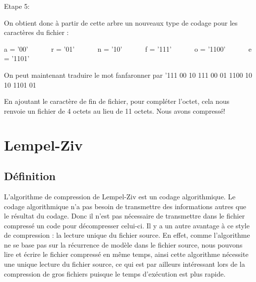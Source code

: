 \documentclass{report}
\begin{document}
Etape 5: 



On obtient donc à partir de cette arbre un nouveaux type de codage pour les caractères du fichier :

a = '00' \ \ \ \ \ \ r = '01' \ \ \ \ \ \ n = '10' \ \ \ \ \ \ f = '111' \ \ \ \ \ \ o = '1100' \ \ \ \ \ \  e = '1101'

On peut maintenant traduire le mot fanfaronner par '111 00 10 111 00 01 1100 10 10 1101 01

En ajoutant le caractère de fin de fichier, pour compléter l'octet, cela nous renvoie un fichier de 4 octets au lieu de 11 octets. Nous avons  compressé!

\chapter*{Lempel-Ziv}
\section*{Définition }

L'algorithme de compression de Lempel-Ziv est un codage algorithmique.  Le codage algorithmique n’a pas besoin de transmettre des informations autres que le résultat du codage. Donc il n'est pas nécessaire de transmettre dans le fichier compressé un code pour décompresser celui-ci. Il y a un autre avantage à ce style de compression : la lecture unique du fichier source. En effet, comme l'algorithme ne se base pas sur la récurrence de modèle dans le fichier source, nous pouvons lire et écrire le fichier compressé en même temps, ainsi cette algorithme nécessite une unique lecture du fichier source, ce qui est par ailleurs intéressant lors de la compression de gros fichiers puisque le temps d'exécution est plus rapide. 
\end{document}
